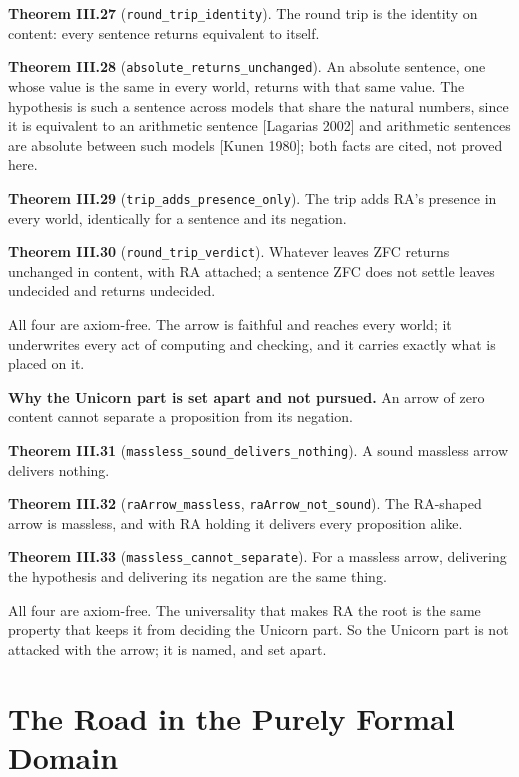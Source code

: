 \documentclass[10pt]{article}
\begin{document}
\textbf{Theorem III.27} (\texttt{round\_trip\_identity}). The round trip
is the identity on content: every sentence returns equivalent to itself.

\textbf{Theorem III.28} (\texttt{absolute\_returns\_unchanged}). An
absolute sentence, one whose value is the same in every world, returns
with that same value. The hypothesis is such a sentence across models
that share the natural numbers, since it is equivalent to an arithmetic
sentence {[}Lagarias 2002{]} and arithmetic sentences are absolute
between such models {[}Kunen 1980{]}; both facts are cited, not proved
here.

\textbf{Theorem III.29} (\texttt{trip\_adds\_presence\_only}). The trip
adds RA's presence in every world, identically for a sentence and its
negation.

\textbf{Theorem III.30} (\texttt{round\_trip\_verdict}). Whatever leaves
ZFC returns unchanged in content, with RA attached; a sentence ZFC does
not settle leaves undecided and returns undecided.

All four are axiom-free. The arrow is faithful and reaches every world;
it underwrites every act of computing and checking, and it carries
exactly what is placed on it.

\textbf{Why the Unicorn part is set apart and not pursued.} An arrow of
zero content cannot separate a proposition from its negation.

\textbf{Theorem III.31} (\texttt{massless\_sound\_delivers\_nothing}). A
sound massless arrow delivers nothing.

\textbf{Theorem III.32} (\texttt{raArrow\_massless},
\texttt{raArrow\_not\_sound}). The RA-shaped arrow is massless, and with
RA holding it delivers every proposition alike.

\textbf{Theorem III.33} (\texttt{massless\_cannot\_separate}). For a
massless arrow, delivering the hypothesis and delivering its negation
are the same thing.

All four are axiom-free. The universality that makes RA the root is the
same property that keeps it from deciding the Unicorn part. So the
Unicorn part is not attacked with the arrow; it is named, and set apart.

\hypertarget{the-road-in-the-purely-formal-domain}{%
\section{The Road in the Purely Formal
Domain}\label{the-road-in-the-purely-formal-domain}}
\end{document}

